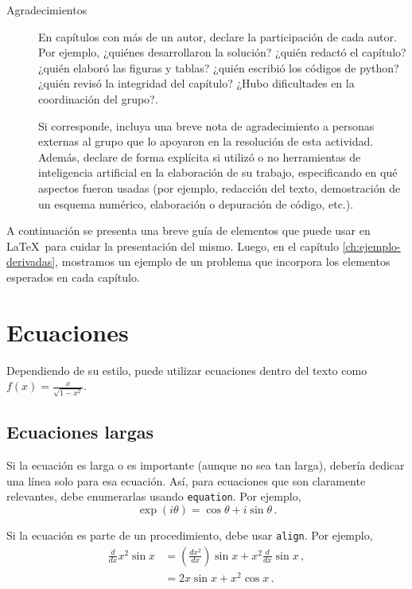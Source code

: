 \documentclass[../portafolio.tex]{subfiles}
\begin{document}
\begin{description}
\item[Agradecimientos] En capítulos con más de un autor, declare la
  participación de cada autor. Por ejemplo, ¿quiénes desarrollaron la
  solución?  ¿quién redactó el capítulo? ¿quién elaboró las figuras y
  tablas?  ¿quién escribió los códigos de python? ¿quién revisó la
  integridad del capítulo? ¿Hubo dificultades en la coordinación del
  grupo?.

  Si corresponde, incluya una breve nota de
  agradecimiento a personas externas al grupo que lo apoyaron en la resolución de
  esta actividad. Además, declare de forma explícita si utilizó o no
  herramientas de inteligencia artificial en la elaboración de su
  trabajo, especificando en qué aspectos fueron usadas (por ejemplo,
  redacción del texto, demostración de un esquema numérico,
  elaboración o depuración de código, etc.).
\end{description}

A continuación se presenta una breve guía de elementos que puede usar en \LaTeX\ para cuidar la presentación del mismo. Luego, en el capítulo \ref{ch:ejemplo-derivadas}, mostramos un ejemplo de un problema que incorpora los elementos esperados en cada capítulo.


\section{Ecuaciones}

Dependiendo de su estilo, puede utilizar ecuaciones dentro del texto como
$f(x)=\frac{x}{\sqrt{1-x^2}}$.

\subsection{Ecuaciones largas}
Si la ecuación es larga o es importante (aunque no sea tan larga),
debería dedicar una línea solo para esa ecuación. Así, para ecuaciones
que son claramente relevantes, debe enumerarlas usando
\lstinline[language=TeX]!equation!. Por ejemplo,
\begin{equation}
  \label{eq:euler}
\exp(i\theta) = \cos\theta + i\sin\theta \,.
\end{equation}

Si la ecuación es parte de un procedimiento, debe usar \lstinline[language=TeX]!align!. Por ejemplo,
\begin{align}
  \frac{d}{dx} x^2 \sin x
  &= \left(\frac{dx^2}{dx}\right)  \sin x + x^2 \frac{d}{dx} \sin x \,, \nonumber \\
  &= 2x \sin x + x^2 \cos x \,. \label{eq:regla-producto}
\end{align}
\end{document}
